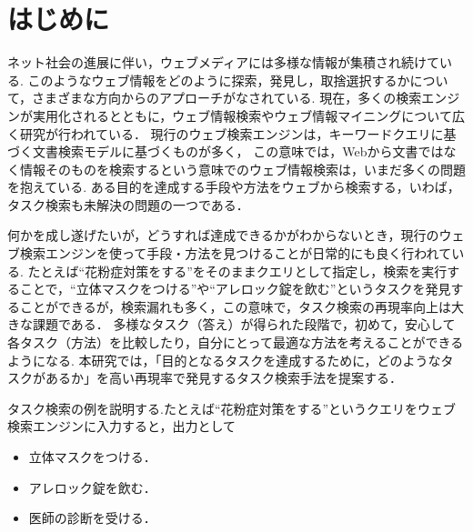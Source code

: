 \documentclass[submit,techreq]{ipsj}
\begin{document}
\section{はじめに}

ネット社会の進展に伴い，ウェブメディアには多様な情報が集積され続けている.
このようなウェブ情報をどのように探索，発見し，取捨選択するかについて，さまざまな方向からのアプローチがなされている. 
現在，多くの検索エンジンが実用化されるとともに，ウェブ情報検索やウェブ情報マイニングについて広く研究が行われている．
現行のウェブ検索エンジンは，キーワードクエリに基づく文書検索モデルに基づくものが多く，
この意味では，Webから文書ではなく情報そのものを検索するという意味でのウェブ情報検索は，いまだ多くの問題を抱えている. 
ある目的を達成する手段や方法をウェブから検索する，いわば，タスク検索も未解決の問題の一つである．

何かを成し遂げたいが，どうすれば達成できるかがわからないとき，現行のウェブ検索エンジンを使って手段・方法を見つけることが日常的にも良く行われている. 
たとえば``花粉症対策をする''をそのままクエリとして指定し，検索を実行することで，``立体マスクをつける''や``アレロック錠を飲む''というタスクを発見することができるが，検索漏れも多く，この意味で，タスク検索の再現率向上は大きな課題である．
多様なタスク（答え）が得られた段階で，初めて，安心して各タスク（方法）を比較したり，自分にとって最適な方法を考えることができるようになる.
本研究では，「目的となるタスクを達成するために，どのようなタスクがあるか」を高い再現率で発見するタスク検索手法を提案する．


タスク検索の例を説明する.たとえば``花粉症対策をする''というクエリをウェブ検索エンジンに入力すると，出力として
\begin{itemize}
\item 立体マスクをつける．
\item アレロック錠を飲む．
\item 医師の診断を受ける．
\end{itemize}
\end{document}
